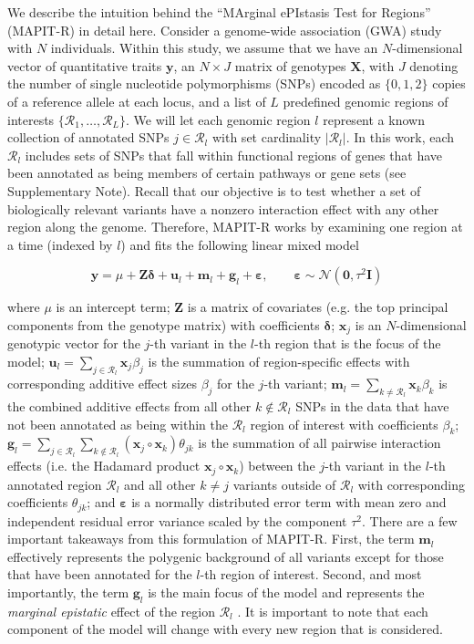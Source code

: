 \documentclass[10pt]{article}
\newcommand{\bg}{\mathbf{g}}
\newcommand{\bx}{\mathbf{x}}
\newcommand{\by}{\mathbf{y}}
\newcommand{\bu}{\mathbf{u}}
\newcommand{\bfm}{\mathbf{m}}
\newcommand{\bX}{\mathbf{X}}
\newcommand{\bZ}{\mathbf{Z}}
\newcommand{\bI}{\mathbf{I}}
\newcommand{\N}{\mathcal{N}}
\newcommand{\bvarepsilon}{\boldsymbol\varepsilon}
\newcommand{\bdelta}{\boldsymbol\delta}
\begin{document}
We describe the intuition behind the ``MArginal ePIstasis Test for Regions'' (MAPIT-R) in detail here. Consider a genome-wide association (GWA) study with $N$ individuals. Within this study, we assume that we have an $N$-dimensional vector of quantitative traits $\by$, an $N\times J$ matrix of genotypes $\bX$, with $J$ denoting the number of single nucleotide polymorphisms (SNPs) encoded as $\{0,1,2\}$ copies of a reference allele at each locus, and a list of $L$ predefined genomic regions of interests $\{\mathcal{R}_1,\ldots,\mathcal{R}_L\}$. We will let each genomic region $l$ represent a known collection of annotated SNPs $j\in\mathcal{R}_l$ with set cardinality $|\mathcal{R}_l|$. In this work, each $\mathcal{R}_l$ includes sets of SNPs that fall within functional regions of genes that have been annotated as being members of certain pathways or gene sets (see Supplementary Note). Recall that our objective is to test whether a set of biologically relevant variants have a nonzero interaction effect with any other region along the genome. Therefore, MAPIT-R works by examining one region at a time (indexed by $l$) and fits the following linear mixed model
\begin{linenomath*}
\begin{equation}
\by = \mu +\bZ\bdelta + \bu_l + \bfm_l + \bg_l +\bvarepsilon, \quad\quad \bvarepsilon\sim\N(\bm{0},\tau^2\bI)\label{mapit_r}
\end{equation}
\end{linenomath*}
where $\mu$ is an intercept term; $\bZ$ is a matrix of covariates (e.g. the top principal components from the genotype matrix) with coefficients $\bdelta$; $\bx_j$ is an $N$-dimensional genotypic vector for the $j$-th variant in the $l$-th region that is the focus of the model; $\bu_l = \sum_{j\in\mathcal{R}_l}\bx_j\beta_j$ is the summation of region-specific effects with corresponding additive effect sizes $\beta_j$ for the $j$-th variant; $\bfm_l = \sum_{k\ne\mathcal{R}_l}\bx_k\beta_k$ is the combined additive effects from all other $k\not\in\mathcal{R}_l$ SNPs in the data that have not been annotated as being within the $\mathcal{R}_l$ region of interest with coefficients $\beta_k$; $\bg_l = \sum_{j\in\mathcal{R}_l}\sum_{k\not\in\mathcal{R}_l}(\bx_j\circ\bx_k)\theta_{jk}$ is the summation of all pairwise interaction effects (i.e. the Hadamard product $\bx_j\circ\bx_k$) between the $j$-th variant in the $l$-th annotated region $\mathcal{R}_l$ and all other $k\ne j$ variants outside of $\mathcal{R}_l$ with corresponding coefficients $\theta_{jk}$; and $\bvarepsilon$ is a normally distributed error term with mean zero and independent residual error variance scaled by the component $\tau^2$. There are a few important takeaways from this formulation of MAPIT-R. First, the term $\bfm_l$ effectively represents the polygenic background of all variants except for those that have been annotated for the $l$-th region of interest. Second, and most importantly, the term $\bg_l$ is the main focus of the model and represents the \textit{marginal epistatic} effect of the region $\mathcal{R}_l$ \cite{Crawford2017a,Crawford2018b}. It is important to note that each component of the model will change with every new region that is considered.
\end{document}
